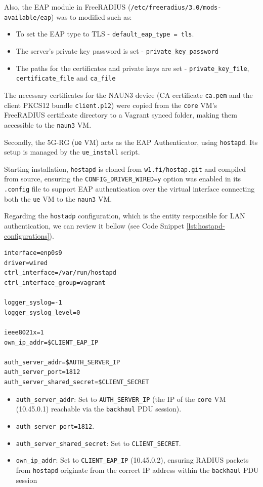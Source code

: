 Also, the \ac{EAP} module in FreeRADIUS (\texttt{/etc/freeradius/3.0/mods-available/eap}) was to modified such as:

\begin{itemize}
    \item To set the \ac{EAP} type to \ac{TLS} - \texttt{default\_eap\_type = tls}.
    \item The server's private key password is set - \texttt{private\_key\_password}
    \item The paths for the certificates and private keys are set - \texttt{private\_key\_file}, \texttt{certificate\_file} and \texttt{ca\_file}
\end{itemize}

The necessary certificates for the \ac{NAUN3} device (\ac{CA} certificate \texttt{ca.pem} and the client \ac{PKCS12} bundle \texttt{client.p12}) were copied from the \texttt{core} \ac{VM}'s FreeRADIUS certificate directory to a Vagrant synced folder, making them accessible to the \texttt{naun3} \ac{VM}.

Secondly, the \ac{5G-RG} (\texttt{ue} \ac{VM}) acts as the \ac{EAP} Authenticator, using \texttt{hostapd}. Its setup is managed by the \texttt{ue\_install} script.

Starting installation, \texttt{hostapd} is cloned from \texttt{w1.fi/hostap.git} and compiled from source, ensuring the \texttt{CONFIG\_DRIVER\_WIRED=y} option was enabled in its \texttt{.config} file to support \ac{EAP} authentication over the virtual interface connecting both the \texttt{ue} \ac{VM} to the \texttt{naun3} \ac{VM}.

Regarding the \texttt{hostadp} configuration, which is the entity responsible for \ac{LAN} authentication, we can review it bellow (see Code Snippet \ref{lst:hostapd-configurations}).

\begin{lstlisting}[caption=hostapd configurations,label={lst:hostapd-configurations}]
interface=enp0s9
driver=wired
ctrl_interface=/var/run/hostapd
ctrl_interface_group=vagrant

logger_syslog=-1
logger_syslog_level=0

ieee8021x=1 
own_ip_addr=$CLIENT_EAP_IP

auth_server_addr=$AUTH_SERVER_IP
auth_server_port=1812
auth_server_shared_secret=$CLIENT_SECRET
\end{lstlisting}

\begin{itemize}
    \item \texttt{auth\_server\_addr}: Set to \texttt{AUTH\_SERVER\_IP} (the \ac{IP} of the \texttt{core} \ac{VM} (10.45.0.1) reachable via the \texttt{backhaul} \ac{PDU} session).
    \item \texttt{auth\_server\_port=1812}.
    \item \texttt{auth\_server\_shared\_secret}: Set to \texttt{CLIENT\_SECRET}.
    \item \texttt{own\_ip\_addr}: Set to \texttt{CLIENT\_EAP\_IP} (10.45.0.2), ensuring \ac{RADIUS} packets from \texttt{hostapd} originate from the correct \ac{IP} address within the \texttt{backhaul} \ac{PDU} session
\end{itemize}

